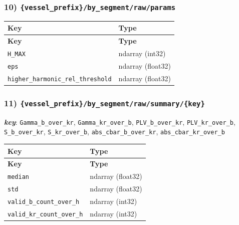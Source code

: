 \documentclass[11pt]{article}
\begin{document}
\subsubsection*{10) \texttt{\{vessel\_\allowbreak{}prefix\}/\allowbreak{}by\_\allowbreak{}segment/\allowbreak{}raw/\allowbreak{}params}}
\begin{longtable}{|p{}|p{}|}
\hline
\textbf{Key} & \textbf{Type} \\ \hline
\endfirsthead
\hline
\textbf{Key} & \textbf{Type} \\ \hline
\endhead
\texttt{H\_\allowbreak{}MAX} & ndarray (int32) \\ \hline
\texttt{eps} & ndarray (float32) \\ \hline
\texttt{higher\_\allowbreak{}harmonic\_\allowbreak{}rel\_\allowbreak{}threshold} & ndarray (float32) \\ \hline
\end{longtable}

\subsubsection*{11) \texttt{\{vessel\_\allowbreak{}prefix\}/\allowbreak{}by\_\allowbreak{}segment/\allowbreak{}raw/\allowbreak{}summary/\allowbreak{}\{key\}}}
\textbf{\textit{key}}: \texttt{Gamma\_\allowbreak{}b\_\allowbreak{}over\_\allowbreak{}kr}, \texttt{Gamma\_\allowbreak{}kr\_\allowbreak{}over\_\allowbreak{}b}, \texttt{PLV\_\allowbreak{}b\_\allowbreak{}over\_\allowbreak{}kr}, \texttt{PLV\_\allowbreak{}kr\_\allowbreak{}over\_\allowbreak{}b}, \texttt{S\_\allowbreak{}b\_\allowbreak{}over\_\allowbreak{}kr}, \texttt{S\_\allowbreak{}kr\_\allowbreak{}over\_\allowbreak{}b}, \texttt{abs\_\allowbreak{}cbar\_\allowbreak{}b\_\allowbreak{}over\_\allowbreak{}kr}, \texttt{abs\_\allowbreak{}cbar\_\allowbreak{}kr\_\allowbreak{}over\_\allowbreak{}b}
\begin{longtable}{|p{}|p{}|}
\hline
\textbf{Key} & \textbf{Type} \\ \hline
\endfirsthead
\hline
\textbf{Key} & \textbf{Type} \\ \hline
\endhead
\texttt{median} & ndarray (float32) \\ \hline
\texttt{std} & ndarray (float32) \\ \hline
\texttt{valid\_\allowbreak{}b\_\allowbreak{}count\_\allowbreak{}over\_\allowbreak{}h} & ndarray (int32) \\ \hline
\texttt{valid\_\allowbreak{}kr\_\allowbreak{}count\_\allowbreak{}over\_\allowbreak{}h} & ndarray (int32) \\ \hline
\end{longtable}
\end{document}
